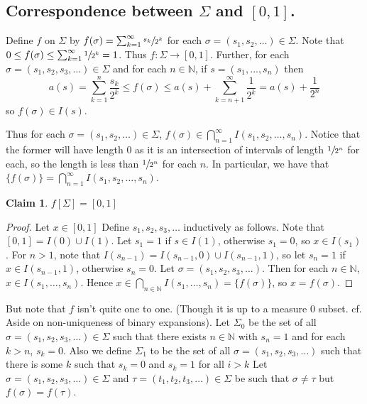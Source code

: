 \documentclass{article}
\newcommand{\N}{\mathbb{N}}
\theoremstyle{definition}
\newtheorem*{claim}{Claim}
\begin{document}
\subsection*{Correspondence between $\Sigma$ and $[0,1]$.}

Define $f$ on $\Sigma$ by $f(\sigma) = \sum_{k=1}^\infty \sfrac{s_k}{2^k}$ for each $\sigma = (s_1,s_2,\dots) \in \Sigma$. Note that $0 \leq f(\sigma) \leq \sum_{k=1}^\infty \sfrac{1}{2^k} = 1$. Thus $f:\Sigma \longrightarrow [0,1]$. Further, for each $\sigma = (s_1, s_2, s_3, \ldots) \in \Sigma$ and for each $n \in \N$, if $s = (s_1, \ldots, s_n)$ then 
\[
    a(s) = \sum_{k=1}^n \frac{s_k}{2^k} \leq f(\sigma) \leq a(s)+\sum_{k=n+1}^\infty \frac{1}{2^k} = a(s)+\frac{1}{2^n}
\]
so $f(\sigma) \in I(s)$.

Thus for each $\sigma = (s_1, s_2, \dots) \in \Sigma$, $f(\sigma) \in \bigcap_{n=1}^\infty I(s_1, s_2, \dots, s_n)$. Notice that the former will have length 0 as it is an intersection of intervals of length $\sfrac{1}{2^n}$ for each, so the length is less than $\sfrac1{2^n}$ for each $n$. In particular, we have that $\{f(\sigma)\} = \bigcap_{n=1}^\infty I(s_1, s_2, \dots, s_n)$.

\begin{claim}
    $f[\Sigma] = [0,1]$
\end{claim}
\begin{proof}
    Let $x \in [0,1]$ Define $s_1, s_2, s_3, \ldots$ inductively as follows. Note that $[0,1] = I(0) \cup I(1)$.
    Let $s_1 = 1$ if $s \in I(1)$, otherwise $s_1 = 0$, so $x \in I(s_1)$.
    For $n > 1$, note that $I(s_{n-1}) = I(s_{n-1}, 0) \cup I(s_{n-1}, 1)$, so let $s_n = 1$ if $x \in I(s_{n-1}, 1)$, otherwise $s_n = 0$.
    Let $\sigma = (s_1, s_2, s_3, \ldots)$. Then for each $n \in \N$, $x \in I(s_1, \ldots, s_n)$.
    Hence $x \in \bigcap_{n\in\N} I(s_1,\dots, s_n) = \{f(\sigma)\}$, so $x = f(\sigma)$.
\end{proof}

But note that $f$ isn't quite one to one. (Though it is up to a measure 0 subset. cf. Aside on non-uniqueness of binary expansions).
Let $\Sigma_0$ be the set of all $\sigma = (s_1, s_2, s_3, \ldots) \in \Sigma$ such that there exists $n \in \N$ with $s_n = 1$ and for each $k > n$, $s_k = 0$.
Also we define $\Sigma_1$ to be the set of all $\sigma = (s_1, s_2, s_3, \ldots )$ such that there is some $k$ such that $s_k = 0$ and $s_k = 1$ for all $i > k$
Let $\sigma = (s_1, s_2, s_3, \dots) \in \Sigma$ and $\tau = (t_1, t_2, t_3, \dots) \in \Sigma$ be such that $\sigma\neq\tau$ but $f(\sigma)=f(\tau)$.
\end{document}
